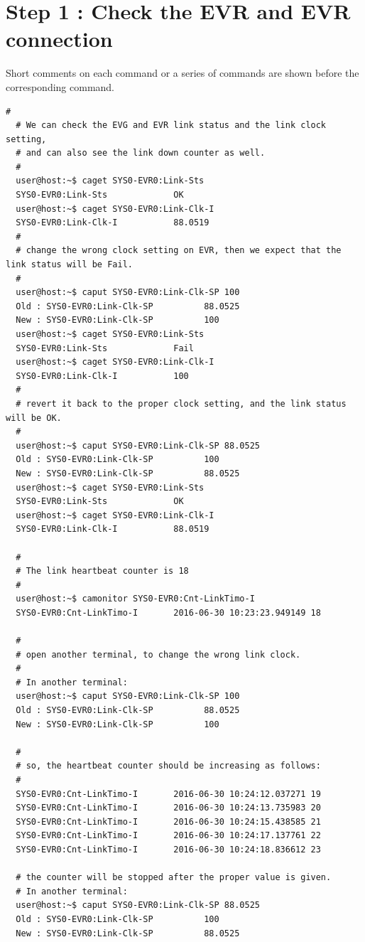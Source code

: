 \documentclass[11pt
  , a4paper
  , article
  , oneside
  , showtrims
]{memoir}
\begin{document}
\section{Step 1 : Check the EVR and EVR connection}
Short comments on each command or a series of commands are shown before the corresponding command.
\begin{lstlisting}[style=termstyle]
  #
  # We can check the EVG and EVR link status and the link clock setting,
  # and can also see the link down counter as well.
  #
  user@host:~$ caget SYS0-EVR0:Link-Sts
  SYS0-EVR0:Link-Sts             OK
  user@host:~$ caget SYS0-EVR0:Link-Clk-I
  SYS0-EVR0:Link-Clk-I           88.0519
  #
  # change the wrong clock setting on EVR, then we expect that the link status will be Fail.  
  #
  user@host:~$ caput SYS0-EVR0:Link-Clk-SP 100
  Old : SYS0-EVR0:Link-Clk-SP          88.0525
  New : SYS0-EVR0:Link-Clk-SP          100
  user@host:~$ caget SYS0-EVR0:Link-Sts
  SYS0-EVR0:Link-Sts             Fail
  user@host:~$ caget SYS0-EVR0:Link-Clk-I
  SYS0-EVR0:Link-Clk-I           100
  #
  # revert it back to the proper clock setting, and the link status will be OK.
  #
  user@host:~$ caput SYS0-EVR0:Link-Clk-SP 88.0525
  Old : SYS0-EVR0:Link-Clk-SP          100
  New : SYS0-EVR0:Link-Clk-SP          88.0525
  user@host:~$ caget SYS0-EVR0:Link-Sts
  SYS0-EVR0:Link-Sts             OK
  user@host:~$ caget SYS0-EVR0:Link-Clk-I
  SYS0-EVR0:Link-Clk-I           88.0519

  #
  # The link heartbeat counter is 18
  #
  user@host:~$ camonitor SYS0-EVR0:Cnt-LinkTimo-I
  SYS0-EVR0:Cnt-LinkTimo-I       2016-06-30 10:23:23.949149 18

  #
  # open another terminal, to change the wrong link clock. 
  #
  # In another terminal:
  user@host:~$ caput SYS0-EVR0:Link-Clk-SP 100
  Old : SYS0-EVR0:Link-Clk-SP          88.0525
  New : SYS0-EVR0:Link-Clk-SP          100

  #
  # so, the heartbeat counter should be increasing as follows: 
  #
  SYS0-EVR0:Cnt-LinkTimo-I       2016-06-30 10:24:12.037271 19
  SYS0-EVR0:Cnt-LinkTimo-I       2016-06-30 10:24:13.735983 20
  SYS0-EVR0:Cnt-LinkTimo-I       2016-06-30 10:24:15.438585 21
  SYS0-EVR0:Cnt-LinkTimo-I       2016-06-30 10:24:17.137761 22
  SYS0-EVR0:Cnt-LinkTimo-I       2016-06-30 10:24:18.836612 23

  # the counter will be stopped after the proper value is given.
  # In another terminal:
  user@host:~$ caput SYS0-EVR0:Link-Clk-SP 88.0525
  Old : SYS0-EVR0:Link-Clk-SP          100
  New : SYS0-EVR0:Link-Clk-SP          88.0525
\end{lstlisting}
\end{document}
